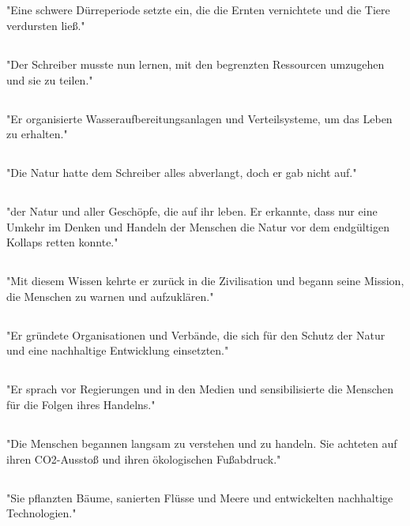 \documentclass{article}
\begin{document}
\subsection{}
"Eine schwere Dürreperiode setzte ein, die die Ernten vernichtete und die Tiere verdursten ließ."
\subsection{}
"Der Schreiber musste nun lernen, mit den begrenzten Ressourcen umzugehen und sie zu teilen."
\subsection{}
"Er organisierte Wasseraufbereitungsanlagen und Verteilsysteme, um das Leben zu erhalten."
\subsection{}
"Die Natur hatte dem Schreiber alles abverlangt, doch er gab nicht auf."
\subsection{}
"der Natur und aller Geschöpfe, die auf ihr leben. Er erkannte, dass nur eine Umkehr im Denken und Handeln der Menschen die Natur vor dem endgültigen Kollaps retten konnte."
\subsection{}
"Mit diesem Wissen kehrte er zurück in die Zivilisation und begann seine Mission, die Menschen zu warnen und aufzuklären."
\subsection{}
"Er gründete Organisationen und Verbände, die sich für den Schutz der Natur und eine nachhaltige Entwicklung einsetzten."
\subsection{}
"Er sprach vor Regierungen und in den Medien und sensibilisierte die Menschen für die Folgen ihres Handelns."
\subsection{}
"Die Menschen begannen langsam zu verstehen und zu handeln. Sie achteten auf ihren CO2-Ausstoß und ihren ökologischen Fußabdruck."
\subsection{}
"Sie pflanzten Bäume, sanierten Flüsse und Meere und entwickelten nachhaltige Technologien."
\end{document}
